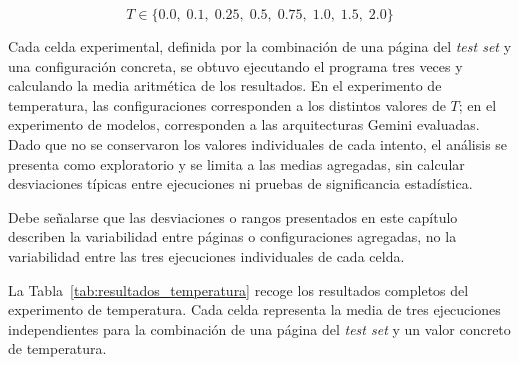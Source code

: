 \[
T \in \{0.0,\; 0.1,\; 0.25,\; 0.5,\; 0.75,\; 1.0,\; 1.5,\; 2.0\}
\]

Cada celda experimental, definida por la combinación de una página del \textit{test set} y una configuración concreta, se obtuvo ejecutando el programa tres veces y calculando la media aritmética de los resultados. En el experimento de temperatura, las configuraciones corresponden a los distintos valores de \(T\); en el experimento de modelos, corresponden a las arquitecturas Gemini evaluadas. Dado que no se conservaron los valores individuales de cada intento, el análisis se presenta como exploratorio y se limita a las medias agregadas, sin calcular desviaciones típicas entre ejecuciones ni pruebas de significancia estadística.

Debe señalarse que las desviaciones o rangos presentados en este capítulo describen la variabilidad entre páginas o configuraciones agregadas, no la variabilidad entre las tres ejecuciones individuales de cada celda.

La Tabla~\ref{tab:resultados_temperatura} recoge los resultados completos del experimento de temperatura. Cada celda representa la media de tres ejecuciones independientes para la combinación de una página del \textit{test set} y un valor concreto de temperatura.

\begin{table}[htbp]
\centering
\scriptsize
\setlength{\tabcolsep}{3pt}
\caption{Resultados de similitud media (\%) para el experimento con diferentes temperaturas}
\label{tab:resultados_temperatura}
\end{table}

